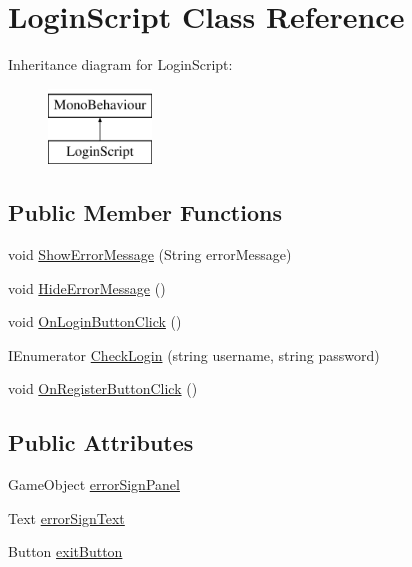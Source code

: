 \hypertarget{classLoginScript}{}\section{Login\+Script Class Reference}
\label{classLoginScript}
Inheritance diagram for Login\+Script\+:\begin{figure}[H]
\begin{center}
\leavevmode
\includegraphics[height=2.000000cm]{classLoginScript}
\end{center}
\end{figure}
\subsection*{Public Member Functions}
\begin{DoxyCompactItemize}
\item 
void \hyperlink{classLoginScript_a6d5719443c6c458ef1124a88586a19aa}{Show\+Error\+Message} (String error\+Message)
\item 
void \hyperlink{classLoginScript_a77fe46bccc7e0ad9f20d9005bb8c33e5}{Hide\+Error\+Message} ()
\item 
void \hyperlink{classLoginScript_add6225612965647c145ad7a21aa31393}{On\+Login\+Button\+Click} ()
\item 
I\+Enumerator \hyperlink{classLoginScript_a15dca71ec2562cb6d64b4f4864afd853}{Check\+Login} (string username, string password)
\item 
void \hyperlink{classLoginScript_a377ed9fb7030ab7b9230b6fba734474d}{On\+Register\+Button\+Click} ()
\end{DoxyCompactItemize}
\subsection*{Public Attributes}
\begin{DoxyCompactItemize}
\item 
Game\+Object \hyperlink{classLoginScript_a397b29c7b1df0798d3436b20bca2ba49}{error\+Sign\+Panel}
\item 
Text \hyperlink{classLoginScript_a787ac0e67c037d5de9360313b597eb5e}{error\+Sign\+Text}
\item 
Button \hyperlink{classLoginScript_a885b1db86ae5ebd841652880d4dbcb0d}{exit\+Button}
\end{DoxyCompactItemize}


